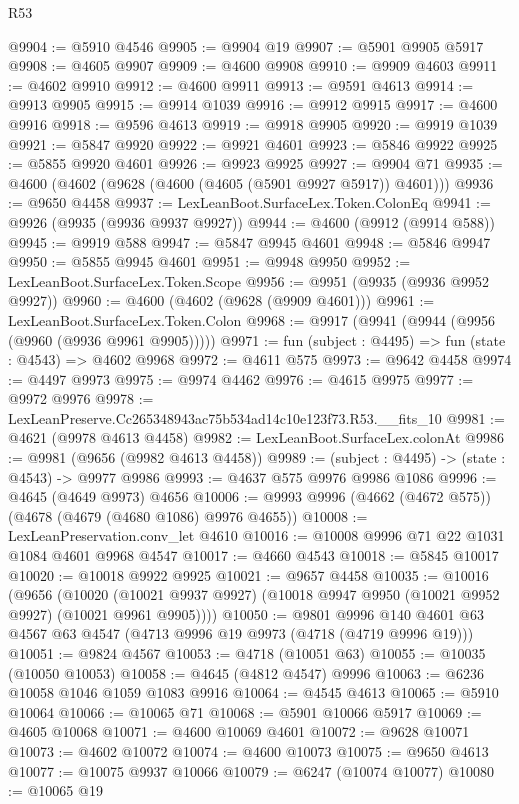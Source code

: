\begin{lexlean}{R53}
\begin{coremodule}
@9904 := @5910 @4546
@9905 := @9904 @19
@9907 := @5901 @9905 @5917
@9908 := @4605 @9907
@9909 := @4600 @9908
@9910 := @9909 @4603
@9911 := @4602 @9910
@9912 := @4600 @9911
@9913 := @9591 @4613
@9914 := @9913 @9905
@9915 := @9914 @1039
@9916 := @9912 @9915
@9917 := @4600 @9916
@9918 := @9596 @4613
@9919 := @9918 @9905
@9920 := @9919 @1039
@9921 := @5847 @9920
@9922 := @9921 @4601
@9923 := @5846 @9922
@9925 := @5855 @9920 @4601
@9926 := @9923 @9925
@9927 := @9904 @71
@9935 := @4600 (@4602 (@9628 (@4600 (@4605 (@5901 @9927 @5917)) @4601)))
@9936 := @9650 @4458
@9937 := LexLeanBoot.SurfaceLex.Token.ColonEq
@9941 := @9926 (@9935 (@9936 @9937 @9927))
@9944 := @4600 (@9912 (@9914 @588))
@9945 := @9919 @588
@9947 := @5847 @9945 @4601
@9948 := @5846 @9947
@9950 := @5855 @9945 @4601
@9951 := @9948 @9950
@9952 := LexLeanBoot.SurfaceLex.Token.Scope
@9956 := @9951 (@9935 (@9936 @9952 @9927))
@9960 := @4600 (@4602 (@9628 (@9909 @4601)))
@9961 := LexLeanBoot.SurfaceLex.Token.Colon
@9968 := @9917 (@9941 (@9944 (@9956 (@9960 (@9936 @9961 @9905)))))
@9971 := fun (subject : @4495) => fun (state : @4543) => @4602 @9968
@9972 := @4611 @575
@9973 := @9642 @4458
@9974 := @4497 @9973
@9975 := @9974 @4462
@9976 := @4615 @9975
@9977 := @9972 @9976
@9978 := LexLeanPreserve.Cc265348943ac75b534ad14c10e123f73.R53.__fits_10
@9981 := @4621 (@9978 @4613 @4458)
@9982 := LexLeanBoot.SurfaceLex.colonAt
@9986 := @9981 (@9656 (@9982 @4613 @4458))
@9989 := (subject : @4495) -> (state : @4543) -> @9977 @9986
@9993 := @4637 @575 @9976 @9986 @1086
@9996 := @4645 (@4649 @9973) @4656
@10006 := @9993 @9996 (@4662 (@4672 @575)) (@4678 (@4679 (@4680 @1086) @9976 @4655))
@10008 := LexLeanPreservation.conv_let @4610
@10016 := @10008 @9996 @71 @22 @1031 @1084 @4601 @9968 @4547
@10017 := @4660 @4543
@10018 := @5845 @10017
@10020 := @10018 @9922 @9925
@10021 := @9657 @4458
@10035 := @10016
    (@9656
      (@10020 (@10021 @9937 @9927) (@10018 @9947 @9950 (@10021 @9952 @9927) (@10021 @9961 @9905))))
@10050 := @9801
    @9996
    @140
    @4601
    @63
    @4567
    @63
    @4547
    (@4713 @9996 @19 @9973 (@4718 (@4719 @9996 @19)))
@10051 := @9824 @4567
@10053 := @4718 (@10051 @63)
@10055 := @10035 (@10050 @10053)
@10058 := @4645 (@4812 @4547) @9996
@10063 := @6236 @10058 @1046 @1059 @1083 @9916
@10064 := @4545 @4613
@10065 := @5910 @10064
@10066 := @10065 @71
@10068 := @5901 @10066 @5917
@10069 := @4605 @10068
@10071 := @4600 @10069 @4601
@10072 := @9628 @10071
@10073 := @4602 @10072
@10074 := @4600 @10073
@10075 := @9650 @4613
@10077 := @10075 @9937 @10066
@10079 := @6247 (@10074 @10077)
@10080 := @10065 @19

\end{coremodule}
\end{lexlean}
